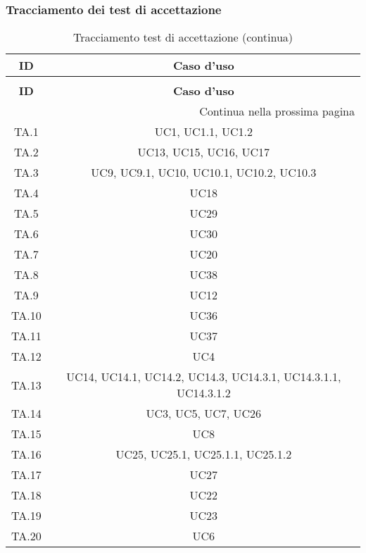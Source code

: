 \clearpage
\subsubsection{Tracciamento dei test di accettazione}

\bgroup
\begin{adjustwidth}{-0.5cm}{-0.5cm}
	\centering
  \begin{longtable}{|c|c|}
		\caption{Tracciamento test di accettazione}
  	\label{tab:tracciamento-test-accettazione} \\
    \hline
		\textbf{ID} & \textbf{Caso d'uso} \\
		\hline
		\endfirsthead

		\caption[]{Tracciamento test di accettazione (continua)} \\
		\hline
		\textbf{ID} & \textbf{Caso d'uso} \\
		\hline
		\endhead

		\hline
		\multicolumn{2}{|r|}{{Continua nella prossima pagina}} \\
		\hline
		\endfoot

		\hline
		\endlastfoot

    TA.1 & UC1, UC1.1, UC1.2\\
		\hline TA.2 & UC13, UC15, UC16, UC17\\
		\hline TA.3 & UC9, UC9.1, UC10, UC10.1, UC10.2, UC10.3\\
		\hline TA.4 & UC18\\
		\hline TA.5 & UC29\\
		\hline TA.6 & UC30\\
		\hline TA.7 & UC20\\
		\hline TA.8 & UC38\\
		\hline TA.9 & UC12\\
		\hline TA.10 & UC36\\
		\hline TA.11 & UC37\\
		\hline TA.12 & UC4\\
		\hline TA.13 & UC14, UC14.1, UC14.2, UC14.3, UC14.3.1, UC14.3.1.1, UC14.3.1.2\\
		\hline TA.14 & UC3, UC5, UC7, UC26\\
		\hline TA.15 & UC8\\
		\hline TA.16 & UC25, UC25.1, UC25.1.1, UC25.1.2\\
		\hline TA.17 & UC27\\
		\hline TA.18 & UC22\\
		\hline TA.19 & UC23\\
		\hline TA.20 & UC6\\
  \end{longtable}
\end{adjustwidth}
\egroup

